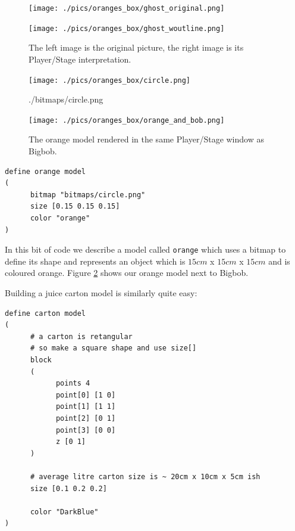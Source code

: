 \documentclass[a4paper]{report}
\newcommand{\plst}{Player/Stage\xspace}
\begin{document}
\begin{figure}
	\centering
	\begin{minipage}[c]{0.3\linewidth}
		\centering
		\texttt{[image: ./pics/oranges\_box/ghost\_original.png]} %
		
	\end{minipage}%
	\hspace{0.05\linewidth}
	\begin{minipage}[c]{0.6\linewidth}
		\centering
		\texttt{[image: ./pics/oranges\_box/ghost\_woutline.png]} 
	\end{minipage}	
	\caption{The left image is the original picture, the right image is its \plst interpretation.}
		\label{fig:BuildingAWorld:OtherStuff:Ghosts}
\end{figure}

\begin{figure}
	\centering
	\begin{minipage}[c]{0.2\linewidth}
		\centering
		\texttt{[image: ./pics/oranges\_box/circle.png]} 
		\caption{./bitmaps/circle.png}
		\label{fig:circle.png}	
	\end{minipage}%
	\hspace{0.1\linewidth}
	\begin{minipage}[c]{0.6\linewidth}
		\centering
		\texttt{[image: ./pics/oranges\_box/orange\_and\_bob.png]} 
		\caption{The orange model rendered in the same \plst window as Bigbob.}
		\label{fig:BuildingAWorld:OtherStuff:OrangeAndBob}
	\end{minipage}	
\end{figure}


\begin{verbatim}
define orange model
(
      bitmap "bitmaps/circle.png"
      size [0.15 0.15 0.15]
      color "orange"
)
\end{verbatim}

In this bit of code we describe a model called \verb|orange| which uses a bitmap to define its shape and represents an object which is $15cm$ x $15cm$ x $15cm$ and is coloured orange. Figure \ref{fig:BuildingAWorld:OtherStuff:OrangeAndBob} shows our orange model next to Bigbob.

Building a juice carton model is similarly quite easy:

\begin{verbatim}
define carton model
(
      # a carton is retangular
      # so make a square shape and use size[]
      block
      (
            points 4
            point[0] [1 0]
            point[1] [1 1]
            point[2] [0 1]
            point[3] [0 0]
            z [0 1]
      )

      # average litre carton size is ~ 20cm x 10cm x 5cm ish
      size [0.1 0.2 0.2]

      color "DarkBlue"
)
\end{verbatim}
\end{document}
